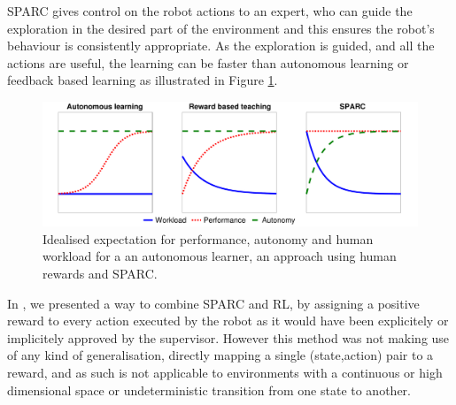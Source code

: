 \documentclass[letterpaper]{article} %
\begin{document}
SPARC gives control on the robot actions to an expert, who can guide the
exploration in the desired part of the environment and this ensures the robot's
behaviour is consistently appropriate. As the exploration is
guided, and all the actions are useful, the learning can be faster than
autonomous learning or feedback based learning as illustrated in Figure
\ref{fig:comparison}.

\begin{figure}
    \centering
    \includegraphics[width=0.9\linewidth]{./fig/motivation.pdf}
    \caption{Idealised expectation for performance, autonomy and human workload for a
    an autonomous learner, an approach using human rewards and SPARC.}
    \label{fig:comparison}
\end{figure}


In \cite{senft2017supervised}, we presented a way to combine SPARC and RL, by
assigning a positive reward to every action executed by the robot as it would
have been explicitely or implicitely approved by the supervisor. However this method
was not making use of any kind of generalisation, directly mapping a
single (state,action) pair to a reward, and as such is not applicable to
environments with a continuous or high dimensional space or undeterministic
transition from one state to another.
\end{document}
